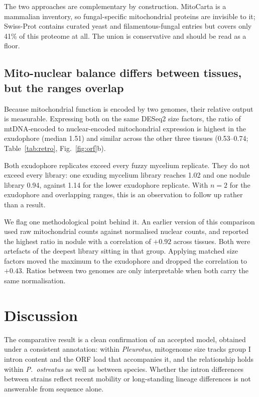 The two approaches are complementary by construction. MitoCarta is a mammalian inventory, so
fungal-specific mitochondrial proteins are invisible to it; Swiss-Prot contains curated yeast
and filamentous-fungal entries but covers only 41\% of this proteome at all. The union is
conservative and should be read as a floor.

\subsection{Mito-nuclear balance differs between tissues, but the ranges overlap}

Because mitochondrial function is encoded by two genomes, their relative output is measurable.
Expressing both on the same DESeq2 size factors, the ratio of mtDNA-encoded to nuclear-encoded
mitochondrial expression is highest in the exudophore (median 1.51) and similar across the
other three tissues (0.53--0.74; Table~\ref{tab:retro}, Fig.~\ref{fig:orf}b).

Both exudophore replicates exceed every fuzzy mycelium replicate. They do not exceed every
library: one exuding mycelium library reaches 1.02 and one nodule library 0.94, against 1.14
for the lower exudophore replicate. With $n=2$ for the exudophore and overlapping ranges, this
is an observation to follow up rather than a result.

We flag one methodological point behind it. An earlier version of this comparison used raw
mitochondrial counts against normalised nuclear counts, and reported the highest ratio in
nodule with a correlation of $+0.92$ across tissues. Both were artefacts of the deepest library
sitting in that group. Applying matched size factors moved the maximum to the exudophore and
dropped the correlation to $+0.43$. Ratios between two genomes are only interpretable when both
carry the same normalisation.

\section{Discussion}

The comparative result is a clean confirmation of an accepted model, obtained under a
consistent annotation: within \textit{Pleurotus}, mitogenome size tracks group I intron content
and the ORF load that accompanies it, and the relationship holds within \textit{P.\ ostreatus}
as well as between species. Whether the intron differences between strains reflect recent
mobility or long-standing lineage differences is not answerable from sequence alone.

